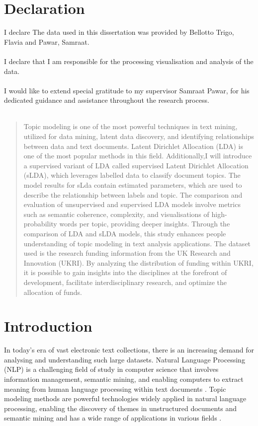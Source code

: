 \documentclass[12pt,twoside]{article}
\begin{document}

\newpage
\thispagestyle{empty} 

\section*{Declaration}
I declare The data used in this dissertation was provided by Bellotto Trigo, Flavia and Pawar, Samraat. \\\\
I declare that I am responsible for the processing visualisation and analysis of the data. \\\\
I would like to extend special gratitude to my supervisor Samraat Pawar, for his dedicated guidance and assistance throughout the research process.
\\\\


\tableofcontents

\newpage
\begin{abstract}
Topic modeling is one of the most powerful techniques in text mining, utilized for data mining, latent data discovery, and identifying relationships between data and text documents. Latent Dirichlet Allocation (LDA) is one of the most popular methods in this field. Additionally,I will introduce a supervised variant of LDA called supervised Latent Dirichlet Allocation (sLDA), which leverages labelled data to classify document topics. The model results for sLda contain estimated parameters, which are used to describe the relationship between labels and topic. The comparison and evaluation of unsupervised and supervised LDA models involve metrics such as semantic coherence, complexity, and visualisations of high-probability words per topic, providing deeper insights. Through the comparison of LDA and sLDA models, this study enhances people understanding of topic modeling in text analysis applications. The dataset used is the research funding information from the UK Research and Innovation (UKRI). By analyzing the distribution of funding within UKRI, it is possible to gain insights into the disciplines at the forefront of development, facilitate interdisciplinary research, and optimize the allocation of funds.

\end{abstract}
\section{Introduction}
In today's era of vast electronic text collections, there is an increasing demand for analysing and understanding such large datasets. Natural Language Processing (NLP) is a challenging field of study in computer science that involves information management, semantic mining, and enabling computers to extract meaning from human language processing within text documents \cite{Jelodar:2019aa}. Topic modeling methods are powerful technologies widely applied in natural language processing, enabling the discovery of themes in unstructured documents and semantic mining \cite{blei2003latent} and has a wide range of applications in various fields \cite{Varghese:2018aa} \cite{Papadatos:2014aa}.\\\\
\end{document}
